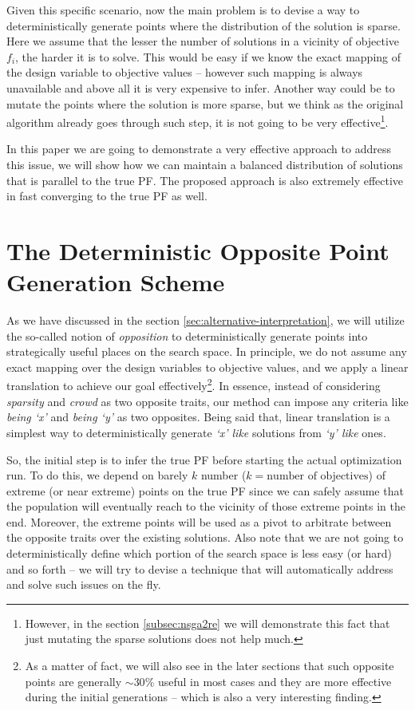 \documentclass[journal]{IEEEtran}
\begin{document}
Given this specific scenario, now the main problem is to devise a way to deterministically generate points where the distribution of the solution is sparse. Here we assume that the lesser the number of solutions in a vicinity of objective \(f_i\), the harder it is to solve. This would be easy if we know the exact mapping of the design variable to objective values -- however such mapping is always unavailable and above all it is very expensive to infer. Another way could be to mutate the points where the solution is more sparse, but we think as the original algorithm already goes through such step, it is not going to be very effective\footnote{However, in the section \ref{subsec:nsga2re} we will demonstrate this fact that just mutating the sparse solutions does not help much.}. 

In this paper we are going to demonstrate a very effective approach to address this issue, we will show how we can maintain a balanced distribution of solutions that is parallel to the true PF. The proposed approach is also extremely effective in fast converging to the true PF as well.   

\section{The Deterministic Opposite Point Generation Scheme}
\label{sec:generation-scheme}
As we have discussed in the section \ref{sec:alternative-interpretation}, we will utilize the so-called notion of \textit{opposition} to deterministically generate points into strategically useful places on the search space. In principle, we do not assume any exact mapping over the design variables to objective values, and we apply a linear translation to achieve our goal effectively\footnote{As a matter of fact, we will also see in the later sections that such opposite points are generally \(\sim 30\%\) useful in most cases and they are more effective during the initial generations -- which is also a very interesting finding.}. In essence, instead of considering \textit{sparsity} and \textit{crowd} as two opposite traits, our method can impose any criteria like \textit{being `x'} and \textit{being `y'} as two opposites. Being said that, linear translation is a simplest way to deterministically generate \textit{`x' like} solutions from \textit{`y' like} ones. 

So, the initial step is to infer the true PF before starting the actual optimization run. To do this, we depend on barely \(k\) number (\(k = \text{number of objectives}\)) of extreme (or near extreme) points on the true PF since we can safely assume that the population will eventually reach to the vicinity of those extreme points in the end. Moreover, the extreme points will be used as a pivot to arbitrate between the opposite traits over the existing solutions. Also note that we are not going to deterministically define which portion of the search space is less easy (or hard) and so forth -- we will try to devise a technique that will automatically address and solve such issues on the fly.
\end{document}
